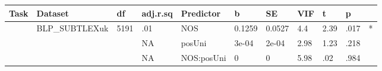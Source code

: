 \begin{table}[ht]
\centering
\begingroup\normalsize
\begin{tabular}{lllllllllll}
  \hline
Task & Dataset & df & adj.r.sq & Predictor & b & SE & VIF & t & p &  \\ 
  \hline
 & BLP\_SUBTLEXuk & 5191 & .01 & NOS & 0.1259 & 0.0527 & 4.4 & 2.39 & .017 & * \\ 
   &  &  & NA & posUni & 3e-04 & 2e-04 & 2.98 & 1.23 & .218 &   \\ 
   &  &  & NA & NOS:posUni & 0 & 0 & 5.98 & .02 & .984 &   \\ 
   \hline
\end{tabular}
\endgroup
\end{table}
